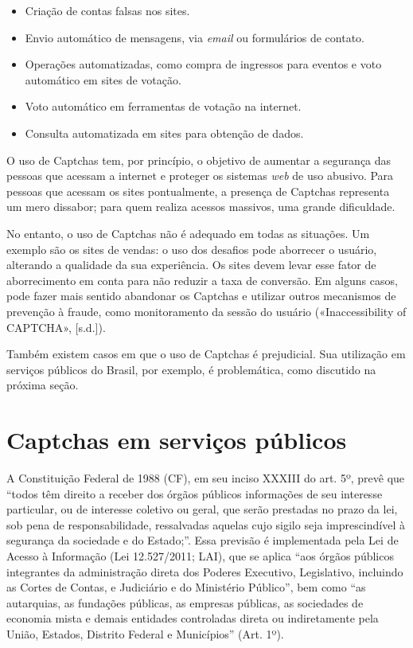 \documentclass[12pt,twoside,brazilian]{book}
\providecommand{\tightlist}{%
  \setlength{\itemsep}{0pt}\setlength{\parskip}{0pt}}
\begin{document}
\begin{itemize}
\tightlist
\item
  Criação de contas falsas nos sites.
\item
  Envio automático de mensagens, via \emph{email} ou formulários de
  contato.
\item
  Operações automatizadas, como compra de ingressos para eventos e voto
  automático em sites de votação.
\item
  Voto automático em ferramentas de votação na internet.
\item
  Consulta automatizada em sites para obtenção de dados.
\end{itemize}

O uso de Captchas tem, por princípio, o objetivo de aumentar a segurança
das pessoas que acessam a internet e proteger os sistemas \emph{web} de
uso abusivo. Para pessoas que acessam os sites pontualmente, a presença
de Captchas representa um mero dissabor; para quem realiza acessos
massivos, uma grande dificuldade.

No entanto, o uso de Captchas não é adequado em todas as situações. Um
exemplo são os sites de vendas: o uso dos desafios pode aborrecer o
usuário, alterando a qualidade da sua experiência. Os sites devem levar
esse fator de aborrecimento em conta para não reduzir a taxa de
conversão. Em alguns casos, pode fazer mais sentido abandonar os
Captchas e utilizar outros mecanismos de prevenção à fraude, como
monitoramento da sessão do usuário ({«Inaccessibility of CAPTCHA»},
{[}s.d.{]}).

Também existem casos em que o uso de Captchas é prejudicial. Sua
utilização em serviços públicos do Brasil, por exemplo, é problemática,
como discutido na próxima seção.

\hypertarget{sec-captchas-publicos}{%
\section{Captchas em serviços públicos}\label{sec-captchas-publicos}}

A Constituição Federal de 1988 (CF), em seu inciso XXXIII do art. 5º,
prevê que ``todos têm direito a receber dos órgãos públicos informações
de seu interesse particular, ou de interesse coletivo ou geral, que
serão prestadas no prazo da lei, sob pena de responsabilidade,
ressalvadas aquelas cujo sigilo seja imprescindível à segurança da
sociedade e do Estado;''. Essa previsão é implementada pela Lei de
Acesso à Informação (Lei 12.527/2011; LAI), que se aplica ``aos órgãos
públicos integrantes da administração direta dos Poderes Executivo,
Legislativo, incluindo as Cortes de Contas, e Judiciário e do Ministério
Público'', bem como ``as autarquias, as fundações públicas, as empresas
públicas, as sociedades de economia mista e demais entidades controladas
direta ou indiretamente pela União, Estados, Distrito Federal e
Municípios'' (Art. 1º).
\end{document}
